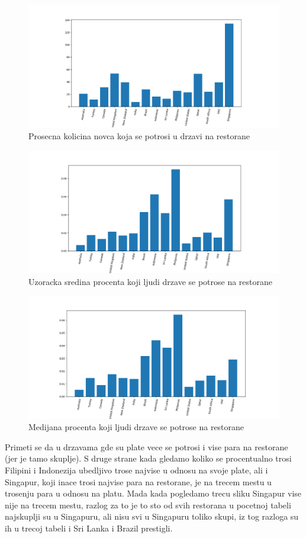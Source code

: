 \documentclass[11pt]{article} %
\begin{document}
\begin{figure}[h!]
	\centering
	\includegraphics[width=1.2\textwidth]{../images/avgPricePerCountry}
	\caption{Prosecna kolicina novca koja se potrosi u drzavi na restorane}
\end{figure}
\begin{figure}[h!]
	\centering
	\includegraphics[width=1.2\textwidth]{../images/meanSalaryPercentPerCountry}
	\caption{Uzoracka sredina procenta koji ljudi drzave se potrose na restorane}
\end{figure}
\begin{figure}[h!]
	\centering
	\includegraphics[width=1.2\textwidth]{../images/medianSalaryPercentPerCountry}
	\caption{Medijana procenta koji ljudi drzave se potrose na restorane}
\end{figure}
Primeti se da u drzavama gde su plate vece se potrosi i vise para na restorane (jer je tamo skuplje). S druge strane kada gledamo koliko se procentualno trosi 
Filipini i Indonezija ubedljivo trose najvise u odnosu na svoje plate, ali i Singapur, koji inace trosi najvise para na restorane, je na trecem mestu u trosenju
para u odnosu na platu. Mada kada pogledamo trecu sliku Singapur vise nije na trecem mestu, razlog za to je to sto od svih restorana u pocetnoj tabeli najskuplji 
su u Singapuru, ali nisu svi u Singapuru toliko skupi, iz tog razloga su ih u trecoj tabeli i Sri Lanka i Brazil prestigli.
\newpage
\end{document}
